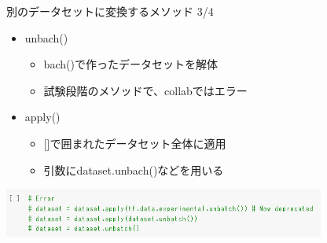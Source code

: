 \documentclass[aspectratio=169, dvipdfmx, 14pt, xcolor={svgnames,dvipsnames}, t]{beamer}
\begin{document}
\begin{frame}{別のデータセットに変換するメソッド 3/4}\label{ux5225ux306eux30c7ux30fcux30bfux30bbux30c3ux30c8ux306bux5909ux63dbux3059ux308bux30e1ux30bdux30c3ux30c9-34}

  \begin{itemize}
    \tightlist
    \item
          unbach()

          \begin{itemize}
            \tightlist
            \item
                  \alert{bach()で作ったデータセットを解体}
            \item
                  試験段階のメソッドで、collabではエラー
          \end{itemize}
    \item
          apply()

          \begin{itemize}
            \tightlist
            \item
                  \alert{{[}{]}で囲まれたデータセット全体に適用}
            \item
                  引数にdataset.unbach()などを用いる
          \end{itemize}
  \end{itemize}

  \centering
  \includegraphics[width=300pt]{img/hands-on-ml_13-1-1_4.png}

\end{frame}

\end{document}
